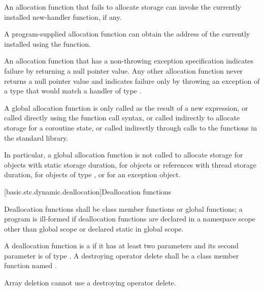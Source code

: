 \pnum
An allocation function that fails to allocate storage can invoke the
currently installed new-handler function, if any.
\begin{note}
%
A program-supplied allocation function can obtain the address of the
currently installed  using the
 function. \end{note}
An allocation function that has a non-throwing
exception specification
indicates failure by returning
a null pointer value.
Any other allocation function
never returns a null pointer value and
indicates failure only by throwing an exception of a type
that would match a handler of type
.

\pnum
A global allocation function is only called as the result of a new
expression, or called directly using the function call
syntax, or called indirectly to allocate storage for
a coroutine state,
or called indirectly through calls to the
functions in the \Cpp{} standard library. \begin{note} In particular, a
global allocation function is not called to allocate storage for objects
with static storage duration, for objects or references
with thread storage duration, for objects of
type , or for an
exception object.
\end{note}

[basic.stc.dynamic.deallocation]{Deallocation functions}

\pnum
{}%
Deallocation functions shall be class member functions or global
functions; a program is ill-formed if deallocation functions are
declared in a namespace scope other than global scope or declared static
in global scope.

\pnum
A deallocation function
is a 
if it has at least two parameters
and its second parameter
is of type .
A destroying operator delete
shall be a class member function named .
\begin{note}
Array deletion cannot use a destroying operator delete.
\end{note}

